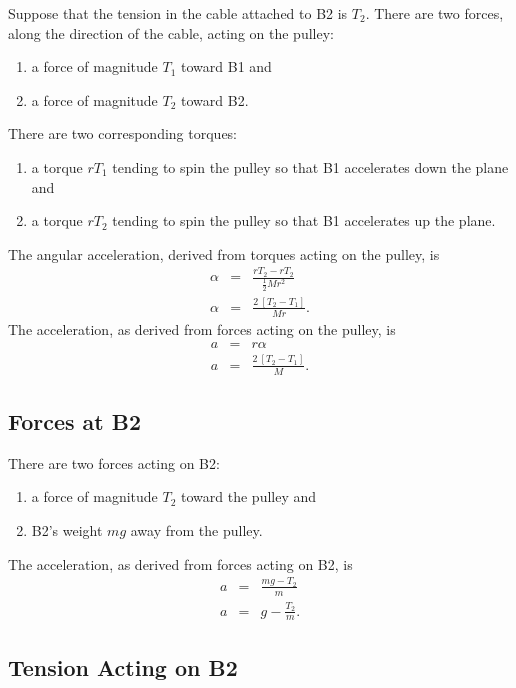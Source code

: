\documentclass[twocolumn]{article}
\begin{document}
Suppose that the tension in the cable attached to B2 is $T_2$. There are two
forces, along the direction of the cable, acting on the pulley:
\begin{enumerate}
   \item a force of magnitude $T_1$ toward B1 and
   \item a force of magnitude $T_2$ toward B2.
\end{enumerate}
There are two corresponding torques:
\begin{enumerate}
   \item a torque $r T_1$ tending to spin the pulley so that B1 accelerates
      down the plane and
   \item a torque $r T_2$ tending to spin the pulley so that B1 accelerates up
      the plane.
\end{enumerate}
The angular acceleration, derived from torques acting on the pulley, is
\begin{eqnarray}
   \nonumber
   \alpha &=& \frac{r T_2 - r T_2}{\tfrac{1}{2} M r^2}\\
   \alpha &=& \frac{2 \: [T_2 - T_1]}{M r}.
\end{eqnarray}
The acceleration, as derived from forces acting on the pulley, is
\begin{eqnarray}
   \nonumber
   a &=& r \alpha\\
   a &=& \frac{2 \: [T_2 - T_1]}{M}.
   \label{eq:pulley}
\end{eqnarray}

\subsection{Forces at B2}

There are two forces acting on B2:
\begin{enumerate}
   \item a force of magnitude $T_2$ toward the pulley and
   \item B2's weight $mg$ away from the pulley.
\end{enumerate}
The acceleration, as derived from forces acting on B2, is
\begin{eqnarray}
   \nonumber
   a &=& \frac{mg - T_2}{m}\\
   a &=& g - \frac{T_2}{m}.
   \label{eq:B2}
\end{eqnarray}

\subsection{Tension Acting on B2}
\end{document}

